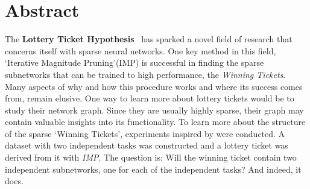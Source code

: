 \chapter*{Abstract}

The \textbf{Lottery Ticket Hypothesis}~\autocite{LTH} has sparked a novel field of research that concerns itself with sparse neural networks.
One key method in this field, `Iterative Magnitude Pruning'(IMP) is successful in finding the sparse subnetworks that can be trained to high performance, the \textit{Winning Tickets}.
Many aspects of why and how this procedure works and where its success comes from, remain elusive.
One way to learn more about lottery tickets would be to study their network graph.
Since they are usually highly sparse, their graph may contain valuable insights into its functionality.
To learn more about the structure of the sparse `Winning Tickets', experiments inspired by \textcite{BIMT} were conducted.
A dataset with two independent tasks was constructed and a lottery ticket was derived from it with \textit{IMP}.
The question is: Will the winning ticket contain two independent subnetworks, one for each of the independent tasks?
And indeed, it does.